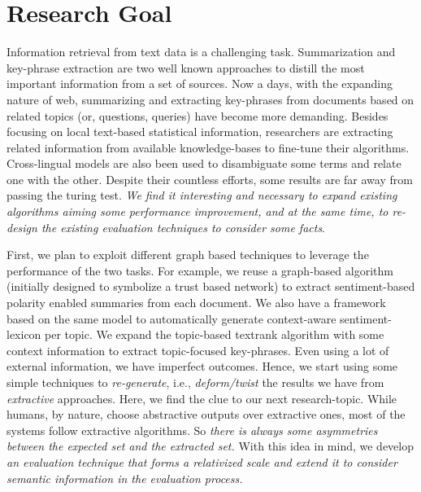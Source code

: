 \documentclass[a4paper]{report}
\begin{document}
\section*{Research Goal}
Information retrieval from text data is a challenging task. Summarization and key-phrase extraction are two well known approaches to distill the most important information from a set of sources. Now a days, with the expanding nature of web, summarizing and extracting key-phrases from documents based on related topics (or, questions, queries) have become more demanding. Besides focusing on local text-based statistical information, researchers are extracting related information from available knowledge-bases to fine-tune their algorithms. Cross-lingual models are also been used to disambiguate some terms and relate one with the other. Despite their countless efforts, some results are far away from passing the turing test. \emph{We find it interesting and necessary to expand existing algorithms aiming some performance improvement, and at the same time, to re-design the existing evaluation techniques to consider some facts}.\\

\par First, we plan to exploit different graph based techniques to leverage the performance of the two tasks. For example, we reuse a graph-based algorithm (initially designed to symbolize a trust based network) to extract sentiment-based polarity enabled summaries from each document. We also have a framework based on the same model to automatically generate context-aware sentiment-lexicon per topic. We expand the topic-based textrank algorithm with some context information to extract topic-focused key-phrases. Even using a lot of external information, we have imperfect outcomes. Hence, we start using some simple techniques to \emph{re-generate}, i.e., \emph{deform/twist} the results we have from \emph{extractive} approaches. Here, we find the clue to our next research-topic. While humans, by nature, choose abstractive outputs over extractive ones, most of the systems follow extractive algorithms. So \emph{there is always some asymmetries between the expected set and the extracted set.} With this idea in mind, we develop \emph{an evaluation technique that forms a relativized scale and extend it to consider semantic information in the evaluation process.}\\
\end{document}
